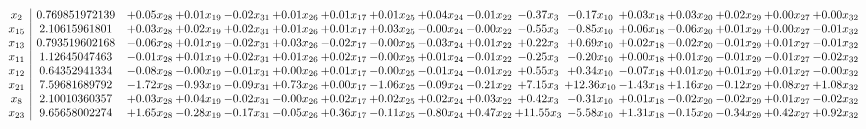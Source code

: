 \documentclass[9pt]{article}
\begin{document}
 \[\begin{array}{c| c c@{\hskip 2pt} c@{\hskip 2pt} c@{\hskip 2pt} c@{\hskip 2pt} c@{\hskip 2pt} c@{\hskip 2pt} c@{\hskip 2pt} c@{\hskip 2pt} c@{\hskip 2pt} c@{\hskip 2pt} c@{\hskip 2pt} c@{\hskip 2pt} c@{\hskip 2pt} c@{\hskip 2pt} c@{\hskip 2pt} }
 x_{2}   &  0.769851972139 & +  0.05 x_{28} & +  0.01 x_{19} & -0.02 x_{31} & +  0.01 x_{26} & +  0.01 x_{17} & +  0.01 x_{25} & +  0.04 x_{24} & -0.01 x_{22} & -0.37 x_{3} & -0.17 x_{10} & +  0.03 x_{18} & +  0.03 x_{20} & +  0.02 x_{29} & +  0.00 x_{27} & +  0.00 x_{32}\\
 x_{15}   &  2.10615961801 & +  0.03 x_{28} & +  0.02 x_{19} & +  0.02 x_{31} & +  0.01 x_{26} & +  0.01 x_{17} & +  0.03 x_{25} & -0.00 x_{24} & -0.00 x_{22} & -0.55 x_{3} & -0.85 x_{10} & +  0.06 x_{18} & -0.06 x_{20} & +  0.01 x_{29} & +  0.00 x_{27} & -0.01 x_{32}\\
 x_{13}   &  0.793519602168 & -0.06 x_{28} & +  0.01 x_{19} & -0.02 x_{31} & +  0.03 x_{26} & -0.02 x_{17} & -0.00 x_{25} & -0.03 x_{24} & +  0.01 x_{22} & +  0.22 x_{3} & +  0.69 x_{10} & +  0.02 x_{18} & -0.02 x_{20} & -0.01 x_{29} & +  0.01 x_{27} & -0.01 x_{32}\\
 x_{11}   &  1.12645047463 & -0.01 x_{28} & +  0.01 x_{19} & +  0.02 x_{31} & +  0.01 x_{26} & +  0.02 x_{17} & -0.00 x_{25} & +  0.01 x_{24} & -0.01 x_{22} & -0.25 x_{3} & -0.20 x_{10} & +  0.00 x_{18} & +  0.01 x_{20} & -0.01 x_{29} & -0.01 x_{27} & -0.02 x_{32}\\
 x_{12}   &  0.64352941334 & -0.08 x_{28} & -0.00 x_{19} & -0.01 x_{31} & +  0.00 x_{26} & +  0.01 x_{17} & -0.00 x_{25} & -0.01 x_{24} & -0.01 x_{22} & +  0.55 x_{3} & +  0.34 x_{10} & -0.07 x_{18} & +  0.01 x_{20} & +  0.01 x_{29} & +  0.01 x_{27} & -0.00 x_{32}\\
 x_{21}   &  7.59681689792 & -1.72 x_{28} & -0.93 x_{19} & -0.09 x_{31} & +  0.73 x_{26} & +  0.00 x_{17} & -1.06 x_{25} & -0.09 x_{24} & -0.21 x_{22} & +  7.15 x_{3} & + 12.36 x_{10} & -1.43 x_{18} & +  1.16 x_{20} & -0.12 x_{29} & +  0.08 x_{27} & +  1.08 x_{32}\\
 x_{8}   &  2.10010360357 & +  0.03 x_{28} & +  0.04 x_{19} & -0.02 x_{31} & -0.00 x_{26} & +  0.02 x_{17} & +  0.02 x_{25} & +  0.02 x_{24} & +  0.03 x_{22} & +  0.42 x_{3} & -0.31 x_{10} & +  0.01 x_{18} & -0.02 x_{20} & -0.02 x_{29} & +  0.01 x_{27} & -0.02 x_{32}\\
 x_{23}   &  9.65658002274 & +  1.65 x_{28} & -0.28 x_{19} & -0.17 x_{31} & -0.05 x_{26} & +  0.36 x_{17} & -0.11 x_{25} & -0.80 x_{24} & +  0.47 x_{22} & + 11.55 x_{3} & -5.58 x_{10} & +  1.31 x_{18} & -0.15 x_{20} & -0.34 x_{29} & +  0.42 x_{27} & +  0.92 x_{32}\\

\end{array}\]
\end{document}
